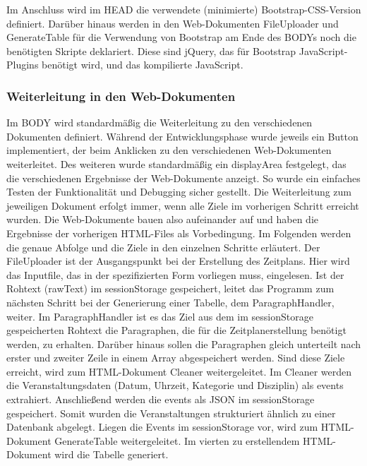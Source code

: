 {Im Anschluss wird im HEAD die verwendete (minimierte) Bootstrap-CSS-Version definiert. 
Darüber hinaus werden in den Web-Dokumenten FileUploader und GenerateTable für die Verwendung von Bootstrap am Ende des BODYs noch die benötigten Skripte deklariert. Diese sind jQuery, das für Bootstrap JavaScript-Plugins benötigt wird, und das kompilierte JavaScript. 

\subsubsection{Weiterleitung in den Web-Dokumenten}
Im BODY wird standardmäßig die Weiterleitung zu den verschiedenen Dokumenten definiert. 
Während der Entwicklungsphase wurde jeweils ein Button implementiert, der beim Anklicken zu den verschiedenen Web-Dokumenten weiterleitet. Des weiteren wurde standardmäßig ein displayArea festgelegt, das die verschiedenen Ergebnisse der Web-Dokumente anzeigt. So wurde ein einfaches Testen der Funktionalität und Debugging sicher gestellt. 
Die Weiterleitung zum jeweiligen Dokument erfolgt immer, wenn alle Ziele im vorherigen Schritt erreicht wurden. Die Web-Dokumente bauen also aufeinander auf und haben die Ergebnisse der vorherigen HTML-Files als Vorbedingung. Im Folgenden werden die genaue Abfolge und die Ziele in den einzelnen Schritte erläutert.
Der FileUploader ist der Ausgangspunkt bei der Erstellung des Zeitplans. Hier wird das Inputfile, das in der spezifizierten Form vorliegen muss, eingelesen. Ist der Rohtext (rawText) im sessionStorage gespeichert, leitet das Programm zum nächsten Schritt bei der Generierung einer Tabelle, dem ParagraphHandler, weiter.
Im ParagraphHandler ist es das Ziel aus dem im sessionStorage gespeicherten Rohtext die Paragraphen, die für die Zeitplanerstellung benötigt werden, zu erhalten. Darüber hinaus sollen die Paragraphen gleich unterteilt nach erster und zweiter Zeile in einem Array abgespeichert werden. Sind diese Ziele erreicht, wird zum HTML-Dokument Cleaner weitergeleitet.
Im Cleaner werden die Veranstaltungsdaten (Datum, Uhrzeit, Kategorie und Disziplin) als events extrahiert. Anschließend werden die events als JSON im sessionStorage gespeichert. Somit wurden die Veranstaltungen strukturiert ähnlich zu einer Datenbank abgelegt. Liegen die Events im sessionStorage vor, wird zum HTML-Dokument GenerateTable weitergeleitet.
Im vierten zu erstellendem HTML-Dokument wird die Tabelle generiert. \\
\\
}
